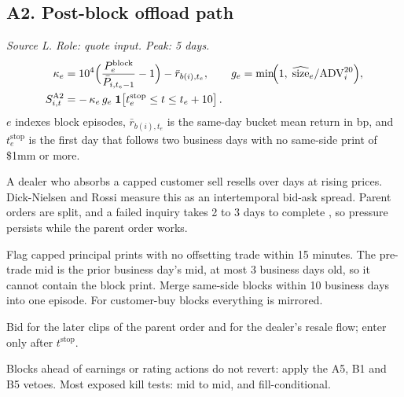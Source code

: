 \documentclass[11pt,letterpaper]{article}
\newcommand{\ind}[1]{\mathbf{1}\!\left[#1\right]}
\newcommand{\Pm}{\bar{P}}                 %
\newcommand{\ADV}{\mathrm{ADV}}
\begin{document}
\subsection{A2. Post-block offload path}
\emph{Source L. Role: quote input. Peak: 5 days.}
\begin{align}
\kappa_e &= 10^4\Bigl(\frac{P^{\mathrm{block}}_e}{\Pm_{i,t_e-1}}-1\Bigr)-\bar r_{b(i),t_e},
\qquad g_e=\min\!\Bigl(1,\;\widehat{\mathrm{size}}_e/\ADV^{20}_i\Bigr),\\
S^{\mathrm{A2}}_{i,t} &= -\,\kappa_e\, g_e\;\ind{t^{\mathrm{stop}}_e\le t\le t_e+10}.
\end{align}
$e$ indexes block episodes, $\bar r_{b(i),t_e}$ is the same-day bucket mean return in bp, and $t^{\mathrm{stop}}_e$ is the first day that follows two business days with no same-side print of \$1mm or more.
\begin{spec}
\item[Mechanism and evidence.] A dealer who absorbs a capped customer sell resells over days at rising prices. Dick-Nielsen and Rossi \cite{dnr2019} measure this as an intertemporal bid-ask spread. Parent orders are split, and a failed inquiry takes 2 to 3 days to complete \cite{klpw2025}, so pressure persists while the parent order works.
\item[Build.] Flag capped principal prints with no offsetting trade within 15 minutes. The pre-trade mid is the prior business day's mid, at most 3 business days old, so it cannot contain the block print. Merge same-side blocks within 10 business days into one episode. For customer-buy blocks everything is mirrored.
\item[Role in the quote.] Bid for the later clips of the parent order and for the dealer's resale flow; enter only after $t^{\mathrm{stop}}$.
\item[Decay and pitfalls.] Blocks ahead of earnings or rating actions do not revert: apply the A5, B1 and B5 vetoes. Most exposed kill tests: mid to mid, and fill-conditional.
\end{spec}
\end{document}
